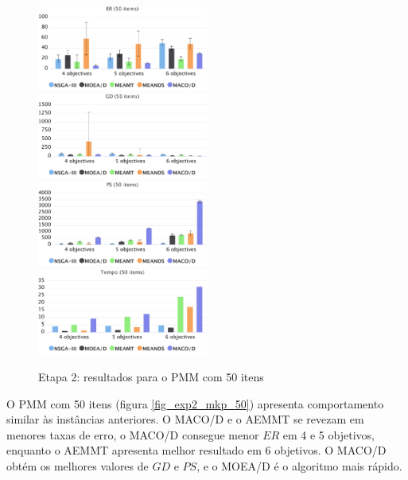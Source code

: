 \begin{figure}[!htbp]
	\caption{Etapa 2: resultados para o PMM com 50 itens}
	\label{fig_exp2_mkp_100}
	\includegraphics[width=0.5\textwidth]{cap_experimentos/figs/etapa2/er-mkp-50}
	\includegraphics[width=0.5\textwidth]{cap_experimentos/figs/etapa2/gd-mkp-50}
	\includegraphics[width=0.5\textwidth]{cap_experimentos/figs/etapa2/ps-mkp-50}
	\includegraphics[width=0.5\textwidth]{cap_experimentos/figs/etapa2/time-mkp-50}
\end{figure}

O PMM com 50 itens (figura \ref{fig_exp2_mkp_50}) apresenta comportamento similar às instâncias anteriores. O MACO/D e o AEMMT se revezam em menores taxas de erro, o MACO/D consegue menor $ER$ em 4 e 5 objetivos, enquanto o AEMMT apresenta melhor resultado em 6 objetivos. O MACO/D obtém os melhores valores de $GD$ e $PS$, e o MOEA/D é o algoritmo mais rápido.

